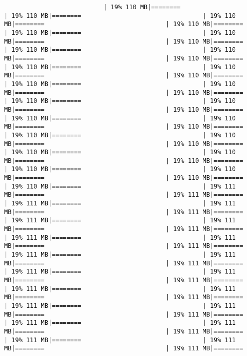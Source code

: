 \documentclass[
]{article}
\begin{document}
\begin{verbatim}
                           | 19% 110 MB|========                                 | 19% 110 MB|========                                 | 19% 110 MB|========                                 | 19% 110 MB|========                                 | 19% 110 MB|========                                 | 19% 110 MB|========                                 | 19% 110 MB|========                                 | 19% 110 MB|========                                 | 19% 110 MB|========                                 | 19% 110 MB|========                                 | 19% 110 MB|========                                 | 19% 110 MB|========                                 | 19% 110 MB|========                                 | 19% 110 MB|========                                 | 19% 110 MB|========                                 | 19% 110 MB|========                                 | 19% 110 MB|========                                 | 19% 110 MB|========                                 | 19% 110 MB|========                                 | 19% 110 MB|========                                 | 19% 110 MB|========                                 | 19% 110 MB|========                                 | 19% 110 MB|========                                 | 19% 110 MB|========                                 | 19% 110 MB|========                                 | 19% 110 MB|========                                 | 19% 110 MB|========                                 | 19% 110 MB|========                                 | 19% 110 MB|========                                 | 19% 110 MB|========                                 | 19% 110 MB|========                                 | 19% 110 MB|========                                 | 19% 111 MB|========                                 | 19% 111 MB|========                                 | 19% 111 MB|========                                 | 19% 111 MB|========                                 | 19% 111 MB|========                                 | 19% 111 MB|========                                 | 19% 111 MB|========                                 | 19% 111 MB|========                                 | 19% 111 MB|========                                 | 19% 111 MB|========                                 | 19% 111 MB|========                                 | 19% 111 MB|========                                 | 19% 111 MB|========                                 | 19% 111 MB|========                                 | 19% 111 MB|========                                 | 19% 111 MB|========                                 | 19% 111 MB|========                                 | 19% 111 MB|========                                 | 19% 111 MB|========                                 | 19% 111 MB|========                                 | 19% 111 MB|========                                 | 19% 111 MB|========                                 | 19% 111 MB|========                                 | 19% 111 MB|========                                 | 19% 111 MB|========                                 | 19% 111 MB|========                                 | 19% 111 MB|========                                 | 19% 111 MB|========                                 | 19% 111 MB|========                               
\end{verbatim}
\end{document}
